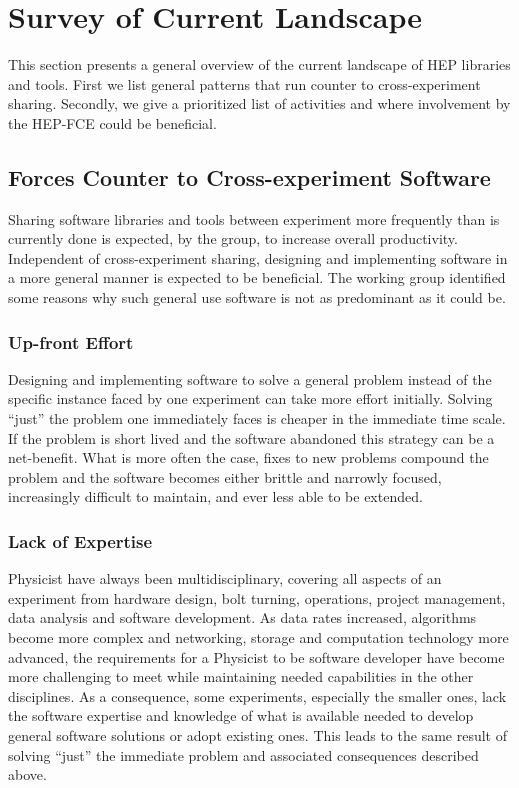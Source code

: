 \section{Survey of Current Landscape}


This section presents a general overview of the current landscape of
HEP libraries and tools.  
%
First we list general patterns that run counter to cross-experiment sharing.
%
%
Secondly, we give a prioritized list of activities and where involvement 
by the HEP-FCE could be beneficial.

\subsection{Forces Counter to Cross-experiment Software}
\label{subsec:pitfalls}

Sharing software libraries and tools between experiment more
frequently than is currently done is expected, by the group, to
increase overall productivity.  Independent of cross-experiment
sharing, designing and implementing software in a more general manner
is expected to be beneficial.  The working group
identified some reasons why such general use software is not as
predominant as it could be.

\subsubsection{Up-front Effort}

Designing and implementing software to solve a general problem instead
of the specific instance faced by one experiment can take more effort
initially.  Solving ``just'' the problem one immediately faces is
cheaper in the immediate time scale.  If the problem is short lived
and the software abandoned this strategy can be a net-benefit.  What
is more often the case, fixes to new problems compound the problem and
the software becomes either brittle and narrowly focused, increasingly
difficult to maintain, and ever less able to be extended.

\subsubsection{Lack of Expertise}

Physicist have always been multidisciplinary, covering all aspects of
an experiment from hardware design, bolt turning, operations, project
management, data analysis and software development.  As data rates
increased, algorithms become more complex and networking, storage and
computation technology more advanced, the requirements for a Physicist to
be software developer have become more challenging to meet while
maintaining needed capabilities in the other
disciplines.  As a consequence, some experiments, especially the smaller
ones, lack the software expertise and knowledge of what is available
needed to develop general software solutions or adopt existing ones.
This leads to the same result of solving ``just'' the immediate
problem and associated consequences described above.

